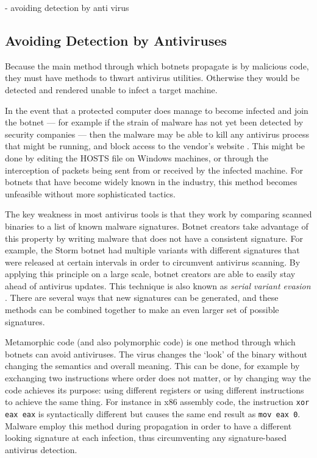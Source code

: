 \documentclass{acm_proc_article-sp}
\begin{document}
    - avoiding detection by anti virus
\subsection{Avoiding Detection by Antiviruses}
Because the main method through which botnets propagate is by malicious code, they must have methods to thwart antivirus utilities. Otherwise they would be detected and rendered unable to infect a target machine. 

In the event that a protected computer does manage to become infected and join the botnet --- for example if the strain of malware has not yet been detected by security companies --- then the malware may be able to kill any antivirus process that might be running, and block access to the vendor’s website \cite{barford:book}. This might be done by editing the HOSTS file on Windows machines, or through the interception of packets being sent from or received by the infected machine. For botnets that have become widely known in the industry, this method becomes unfeasible without more sophisticated tactics.

The key weakness in most antivirus tools is that they work by comparing scanned binaries to a list of known malware signatures. Botnet creators take advantage of this property by writing malware that does not have a consistent signature. For example, the Storm botnet had multiple variants with different signatures that were released at certain intervals in order to circumvent antivirus scanning. By applying this principle on a large scale, botnet creators are able to easily stay ahead of antivirus updates. This technique is also known as \emph{serial variant evasion} \cite{ollmann:evasion}. There are several ways that new signatures can be generated, and these methods can be combined together to make an even larger set of possible signatures.

Metamorphic code (and also polymorphic code) is one method through which botnets can avoid antiviruses. The virus changes the ‘look’ of the binary without changing the semantics and overall meaning. This can be done, for example by exchanging two instructions where order does not matter, or by changing way the code achieves its purpose: using different registers or using different instructions to achieve the same thing. For instance in x86 assembly code, the instruction \texttt{xor eax eax} is syntactically different but causes the same end result as \texttt{mov eax 0}. Malware employ this method during propagation in order to have a different looking signature at each infection, thus circumventing any signature-based antivirus detection.
\end{document}
